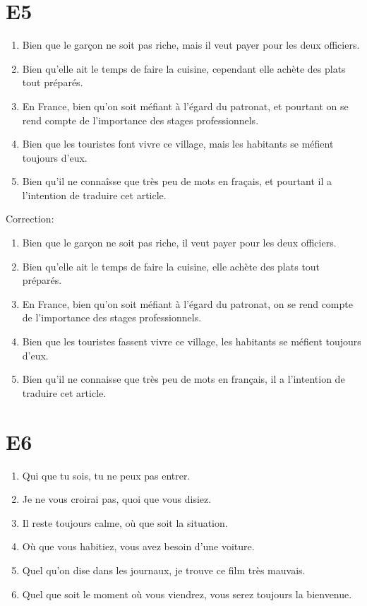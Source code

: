 \documentclass{book}
\begin{document}
    \section{E5}
        \begin{enumerate}
            \item Bien que le garçon ne soit pas riche, mais il veut payer pour les deux officiers.
            \item Bien qu'elle ait le temps de faire la cuisine, cependant elle achète des plats tout préparés.
            \item En France, bien qu'on soit méfiant à l'égard du patronat, et pourtant on se rend compte de l'importance des stages professionnels.
            \item Bien que les touristes font vivre ce village, mais les habitants se méfient toujours d'eux.
            \item Bien qu'il ne connaîsse que très peu de mots en fraçais, et pourtant il a l'intention de traduire cet article.
        \end{enumerate}
        Correction:
        \begin{enumerate}
            \item Bien que le garçon ne soit pas riche, il veut payer pour les deux officiers.
            \item Bien qu'elle ait le temps de faire la cuisine, elle achète des plats tout préparés.
            \item En France, bien qu'on soit méfiant à l'égard du patronat, on se rend compte de l'importance des stages professionnels.
            \item Bien que les touristes fassent vivre ce village, les habitants se méfient toujours d'eux.
            \item Bien qu'il ne connaisse que très peu de mots en français, il a l'intention de traduire cet article.
        \end{enumerate}

    \section{E6}
        \begin{enumerate}
            \item Qui que tu sois, tu ne peux pas entrer.
            \item Je ne vous croirai pas, quoi que vous disiez.
            \item Il reste toujours calme, où que soit la situation.
            \item Où que vous habitiez, vous avez besoin d'une voiture.
            \item Quel qu'on dise dans les journaux, je trouve ce film très mauvais.
            \item Quel que soit le moment où vous viendrez, vous serez toujours la bienvenue.
        \end{enumerate}
\end{document}
